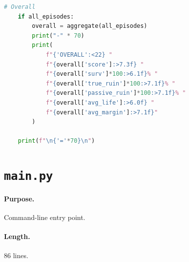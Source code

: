 \begin{lstlisting}[language=Python,basicstyle=\ttfamily\scriptsize,frame=single,breaklines=true]
    # Overall
    if all_episodes:
        overall = aggregate(all_episodes)
        print("-" * 70)
        print(
            f"{'OVERALL':<22} "
            f"{overall['score']:>7.3f} "
            f"{overall['surv']*100:>6.1f}% "
            f"{overall['true_ruin']*100:>7.1f}% "
            f"{overall['passive_ruin']*100:>7.1f}% "
            f"{overall['avg_life']:>6.0f} "
            f"{overall['avg_margin']:>7.1f}"
        )

    print(f"\n{'='*70}\n")

\end{lstlisting}

\section{\texttt{main.py}}
\label{app:code:main-py}

\paragraph{Purpose.} Command-line entry point.

\paragraph{Length.} 86 lines.

